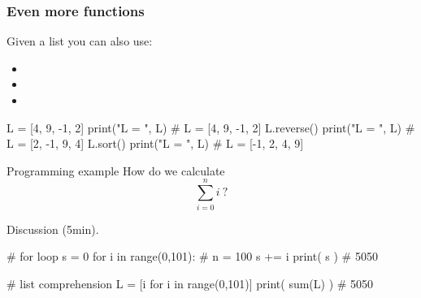 \documentclass[hyperref={pdfpagelabels=false},table, handout]{beamer}
\begin{document}
\begin{frame}[fragile]\frametitle{Even more functions}

 Given a list  you can also use:

  \begin{itemize}
    \item {}
    \item {}
    \item {}
  \end{itemize}

  \pause

\begin{python}
  L = [4, 9, -1, 2]
  print("L = ", L)  # L = [4, 9, -1, 2]
  L.reverse()
  print("L = ", L)  # L = [2, -1, 9, 4]
  L.sort()
  print("L = ", L)  # L = [-1, 2, 4, 9]
\end{python}

\end{frame}


\begin{frame}[fragile]{Programming example}
\vfill
How do we calculate
\[
\sum_{i=0}^n i \ ?
\]

\pause

  Discussion (5min).

\vskip 10pt

\pause

\begin{python}
  # for loop
  s = 0
  for i in range(0,101): # n = 100
      s += i
  print( s ) # 5050
\end{python}

\pause

\begin{python}
  # list comprehension
  L = [i for i in range(0,101)]
  print( sum(L) ) # 5050
\end{python}
\end{frame}

\end{document}
